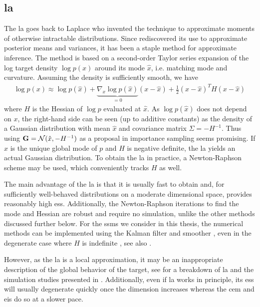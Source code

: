 \subsection{\texorpdfstring{\Acrfull{la}}{Laplace approximation}}
\label{subsec:la}

The \acrfull{la} goes back to Laplace \citep{Laplace1986Memoir} who invented the technique to approximate moments of otherwise intractable distributions. Since \citep{Tierney1986Accurate,Tierney1989Fully} rediscovered its use to approximate posterior means and variances, it has been a staple method for approximate inference.
The method is based on a second-order Taylor series expansion of the log target density $\log p(x)$ around its mode $\hat x$, i.e. matching mode and curvature. Assuming the density is sufficiently smooth, we have
\begin{align}
    \label{eq:LA_approximation}
\log p(x) \approx \log p(\hat x) + \underbrace{\nabla_{x} \log p (\hat x)}_{= 0} \left( x - \hat x \right) + \frac{1}{2} (x - \hat x)^{T} H (x - \hat x)
\end{align}
where $H$ is the Hessian of $\log p$ evaluated at $\hat x$. As $\log p (\hat x)$ does not depend on $x$, the right-hand side can be seen (up to additive constants) as the density of a Gaussian distribution with mean $\hat x$ and covariance matrix $\Sigma = - H^{-1}$. Thus using $\mathbf G = \mathcal N (\hat x, -H^{-1})$ as a proposal in importance sampling seems promising. 
If $\hat x$ is the unique global mode of $p$ and $H$ is negative definite, the \gls{la} yields an actual Gaussian distribution. 
To obtain the \acrshort{la} in practice, a Newton-Raphson scheme may be used, which conveniently tracks $H$ as well. 

The main advantage of the \gls{la} is that it is usually fast to obtain and, for sufficiently well-behaved distributions on a moderate dimensional space, provides reasonably high \gls{ess}. Additionally, the Newton-Raphson iterations to find the mode and Hessian are robust and require no simulation, unlike the other methods discussed further below.
For the \glspl{ssm} we consider in this thesis, the numerical methods can be implemented using the Kalman filter and smoother \citep{Shephard1997Likelihood,Durbin1997Monte}, even in the degenerate case where $H$ is indefinite \citep{Jungbacker2007Monte}, see also .

However, as the \gls{la} is a local approximation, it may be an inappropriate description of the global behavior of the target, see  for a breakdown of \gls{la} and the simulation studies presented in . 
Additionally, even if \gls{la} works in principle, its \gls{ess} will usually degenerate quickly once the dimension increases whereas the \gls{cem} and \gls{eis} do so at a slower pace.

